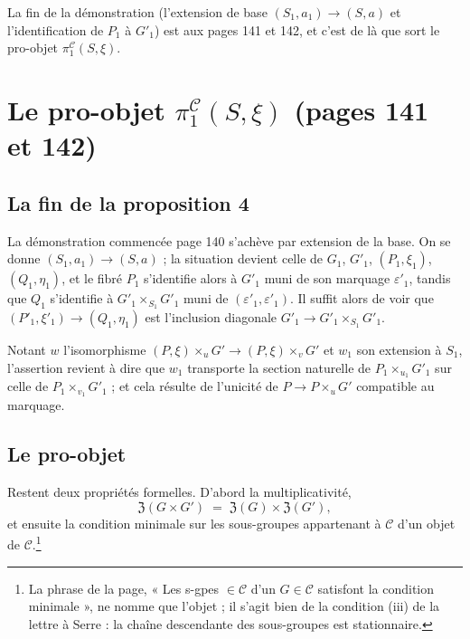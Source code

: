 \documentclass[11pt,a4paper]{article}
\begin{document}
La fin de la démonstration (l'extension de base $(S_{1}, a_{1}) \to (S, a)$
et l'identification de $P_{1}$ à $G'_{1}$) est aux pages 141 et 142, et c'est de
là que sort le pro-objet
$\pi_{1}^{\mathcal{C}}(S, \xi)$.

\section*{Le pro-objet $\pi_{1}^{\mathcal{C}}(S,\xi)$ (pages 141 et 142)}

\subsection*{La fin de la proposition 4}

La démonstration commencée page 140 s'achève par extension de la base. On se
donne $(S_{1}, a_{1}) \to (S, a)$ ; la situation devient celle de $G_{1}$,
$G'_{1}$, $(P_{1}, \xi_{1})$, $(Q_{1}, \eta_{1})$, et le fibré $P_{1}$
s'identifie alors à $G'_{1}$ muni de son marquage $\varepsilon'_{1}$, tandis que
$Q_{1}$ s'identifie à $G'_{1} \times_{S_{1}} G'_{1}$ muni de
$(\varepsilon'_{1}, \varepsilon'_{1})$. Il suffit alors de voir que
$(P'_{1}, \xi'_{1}) \to (Q_{1}, \eta_{1})$ est l'inclusion diagonale
$G'_{1} \to G'_{1} \times_{S_{1}} G'_{1}$.

Notant $w$ l'isomorphisme $(P, \xi) \times_{u} G' \to (P, \xi) \times_{v} G'$
et $w_{1}$ son extension à $S_{1}$, l'assertion revient à dire que $w_{1}$
transporte la section naturelle de $P_{1} \times_{u_{1}} G'_{1}$ sur celle de
$P_{1} \times_{v_{1}} G'_{1}$ ; et cela résulte de l'unicité de
$P \to P \times_{u} G'$ compatible au marquage.


\subsection*{Le pro-objet}

Restent deux propriétés formelles. D'abord la multiplicativité,
\[
  \mathfrak{Z}(G \times G') \;=\; \mathfrak{Z}(G) \times \mathfrak{Z}(G') ,
\]
et ensuite la condition minimale sur les sous-groupes appartenant à
$\mathcal{C}$ d'un objet de $\mathcal{C}$.\footnote{La phrase de la page,
« Les s-gpes $\in \mathcal{C}$ d'un $G \in \mathcal{C}$ satisfont la condition minimale », ne nomme que l'objet ; il s'agit bien de la condition (iii) de la lettre à
Serre : la chaîne descendante des sous-groupes est stationnaire.}
\end{document}

